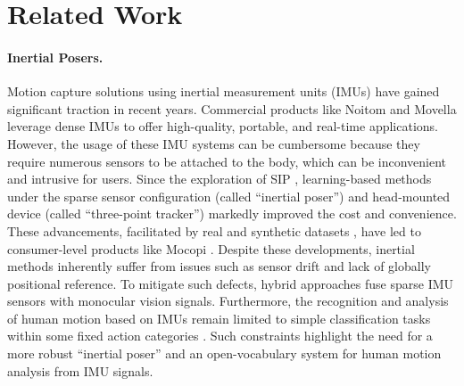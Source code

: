\section{Related Work}
\label{sec:rw}

\paragraph{Inertial Posers.}
Motion capture solutions using inertial measurement units (IMUs) have gained significant traction in recent years. Commercial products like Noitom \cite{noitom} and Movella \cite{Movella} leverage dense IMUs to offer high-quality, portable, and real-time applications. However, the usage of these IMU systems can be cumbersome because they require numerous sensors to be attached to the body, which can be inconvenient and intrusive for users. Since the exploration of SIP \cite{von2017SIP}, learning-based methods under the sparse sensor configuration \cite{huang2018DIP,TransPoseSIGGRAPH2021,TIP22,PIPCVPR2022,van2024diffusionposer,yi2024pnp} (called ``inertial poser'') and head-mounted device \cite{du2023avatars,yang2024divatrack,dai2024hmd,starke2024categorical} (called ``three-point tracker'') markedly improved the cost and convenience. These advancements, facilitated by real and synthetic datasets \cite{trumble2017total,huang2018DIP,AMASS:ICCV:2019}, have led to consumer-level products like Mocopi \cite{mocopi}. Despite these developments, inertial methods inherently suffer from issues such as sensor drift and lack of globally positional reference. To mitigate such defects, hybrid approaches \cite{liang2023hybridcap,ren2023lip,EgoLocate2023,pan2023fusing} fuse sparse IMU sensors with monocular vision signals. Furthermore, the recognition and analysis of human motion based on IMUs remain limited to simple classification tasks within some fixed action categories \cite{stromback2020mm,chen2015utd,yan2024language}. Such constraints highlight the need for a more robust ``inertial poser'' and an open-vocabulary system for human motion analysis from IMU signals.

\vspace{-4mm}
